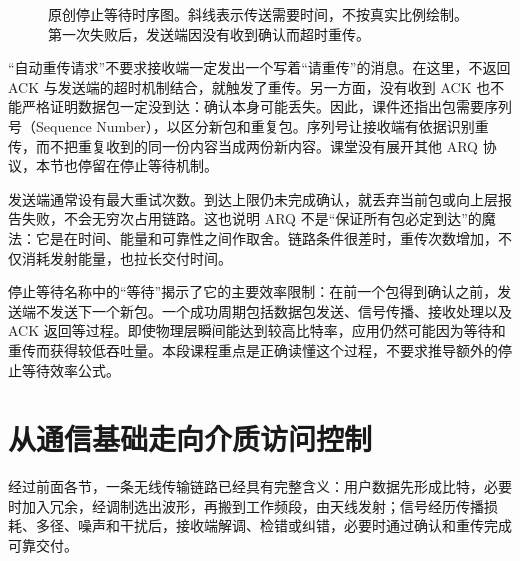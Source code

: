 \begin{figure}[htbp]
\centering
{}
\caption{原创停止等待时序图。斜线表示传送需要时间，不按真实比例绘制。第一次失败后，发送端因没有收到确认而超时重传。}
\end{figure}

“自动重传请求”不要求接收端一定发出一个写着“请重传”的消息。在这里，不返回 ACK 与发送端的超时机制结合，就触发了重传。另一方面，没有收到 ACK 也不能严格证明数据包一定没到达：确认本身可能丢失。因此，课件还指出包需要序列号（Sequence Number），以区分新包和重复包。序列号让接收端有依据识别重传，而不把重复收到的同一份内容当成两份新内容。课堂没有展开其他 ARQ 协议，本节也停留在停止等待机制。

发送端通常设有最大重试次数。到达上限仍未完成确认，就丢弃当前包或向上层报告失败，不会无穷次占用链路。这也说明 ARQ 不是“保证所有包必定到达”的魔法：它是在时间、能量和可靠性之间作取舍。链路条件很差时，重传次数增加，不仅消耗发射能量，也拉长交付时间。

停止等待名称中的“等待”揭示了它的主要效率限制：在前一个包得到确认之前，发送端不发送下一个新包。一个成功周期包括数据包发送、信号传播、接收处理以及 ACK 返回等过程。即使物理层瞬间能达到较高比特率，应用仍然可能因为等待和重传而获得较低吞吐量。本段课程重点是正确读懂这个过程，不要求推导额外的停止等待效率公式。

\section{从通信基础走向介质访问控制}
经过前面各节，一条无线传输链路已经具有完整含义：用户数据先形成比特，必要时加入冗余，经调制选出波形，再搬到工作频段，由天线发射；信号经历传播损耗、多径、噪声和干扰后，接收端解调、检错或纠错，必要时通过确认和重传完成可靠交付。

